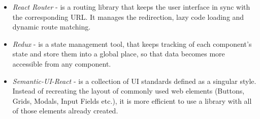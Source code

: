 \begin{itemize}
	\item \textit{React Router} - is a routing library that keeps the user interface in sync with the corresponding URL. It manages the redirection, lazy code loading and dynamic route matching.
	\item \textit{Redux} - is a state management tool, that keeps tracking of each component's state and store them into a global place, so that data becomes more accessible from any component.
	\item \textit{Semantic-UI-React} - is a collection of UI standards defined as a singular style. Instead of recreating the layout of commonly used web elements (Buttons, Grids, Modals, Input Fields etc.), it is more efficient to use a library with all of those elements already created.
\end{itemize}



